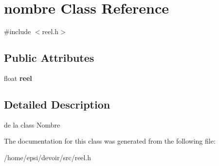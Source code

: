 \hypertarget{classnombre}{}\section{nombre Class Reference}
\label{classnombre}


{\ttfamily \#include $<$reel.\+h$>$}

\subsection*{Public Attributes}
\begin{DoxyCompactItemize}
\item 
\mbox{\label{classnombre_a2bbed2fdc428992bdf023ca8cb37edd7}} 
float {\bfseries reel}
\end{DoxyCompactItemize}


\subsection{Detailed Description}
de la class Nombre 

The documentation for this class was generated from the following file\+:\begin{DoxyCompactItemize}
\item 
/home/epsi/devoir/src/reel.\+h\end{DoxyCompactItemize}

